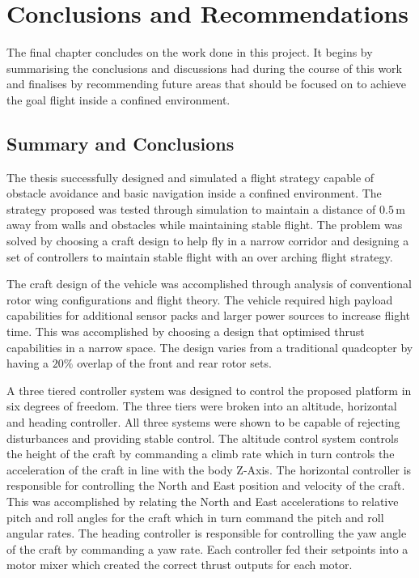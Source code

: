 \chapter{Conclusions and Recommendations}
The final chapter concludes on the work done in this project. It begins by summarising the conclusions and discussions had during the course of this work and finalises by recommending future areas that should be focused on to achieve the goal flight inside a confined environment.

	\section{Summary and Conclusions}
	The thesis successfully designed and simulated a flight strategy capable of obstacle avoidance and basic navigation inside a confined environment. The strategy proposed was tested through simulation to maintain a distance of $0.5$\,m away from walls and obstacles while maintaining stable flight. The problem was solved by choosing a craft design to help fly in a narrow corridor and designing a set of controllers to maintain stable flight with an over arching flight strategy.
	
	The craft design of the vehicle was accomplished through analysis of conventional rotor wing configurations and flight theory. The vehicle required high payload capabilities for additional sensor packs and larger power sources to increase flight time. This was accomplished by choosing a design that optimised thrust capabilities in a narrow space. The design varies from a traditional quadcopter by having a $20\%$ overlap of the front and rear rotor sets.
	
	A three tiered controller system was designed to control the proposed platform in six degrees of freedom. The three tiers were broken into an altitude, horizontal and heading controller. All three systems were shown to be capable of rejecting disturbances and providing stable control. The altitude control system controls the height of the craft by commanding a climb rate which in turn controls the acceleration of the craft in line with the body Z-Axis. The horizontal controller is responsible for controlling the North and East position and velocity of the craft. This was accomplished by relating the North and East accelerations to relative pitch and roll angles for the craft which in turn command the pitch and roll angular rates. The heading controller is responsible for controlling the yaw angle of the craft by commanding a yaw rate. Each controller fed their setpoints into a motor mixer which created the correct thrust outputs for each motor.
	
